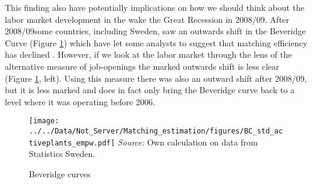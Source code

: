 This finding also have potentially implications on how we should think about the labor market development in the wake the Great Recession in 2008/09. After 2008/09some countries, including Sweden, saw an outwards shift in the Beveridge Curve (Figure \ref{fig:Beveridge}) which have let some analysts to suggest that matching efficiency has declined \citep{Riksbank2012, Hakanson2014}. However, if we look at the labor market through the lens of the alternative measure of job-openings the marked outwards shift is less clear (Figure \ref{fig:Beveridge}, left). Using this measure there was also an outward shift after 2008/09, but it is less marked and does in fact only bring the Beveridge curve back to a level where it was operating before 2006.



\begin{figure}[h]
\centering
\caption{Beveridge curves}
\texttt{[image: ../../Data/Not\_Server/Matching\_estimation/figures/BC\_std\_activeplants\_empw.pdf]}
\flushleft
\footnotesize{\emph{Source:} Own calculation on data from Statistics Sweden.}
\label{fig:Beveridge}
\end{figure}
